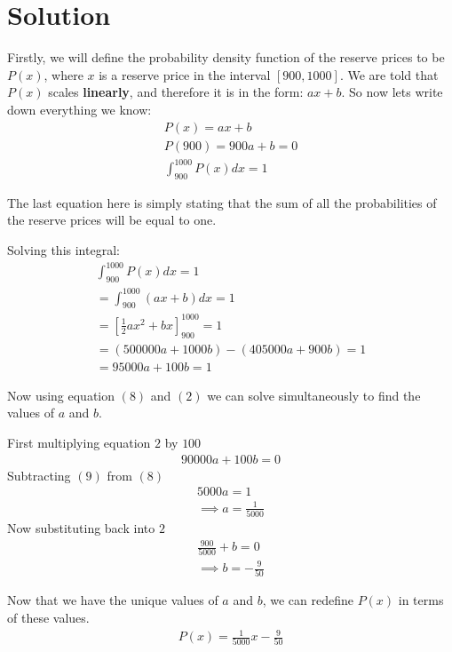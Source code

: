 \documentclass{article}
\begin{document}
\section*{Solution}
\indent Firstly, we will define the probability density function of the reserve prices to be 
$P(x)$, where $x$ is a reserve price in the interval $[900, 1000]$. We are told that $P(x)$
scales \textbf{linearly}, and therefore it is in the form: $ax + b$. So now lets write down
everything we know:
\setlength{\jot}{15pt} %
\begin{gather}
    P(x) = ax + b \\
    P(900) = 900a + b = 0 \\
    \int_{900}^{1000}P(x)dx = 1
\end{gather}

The last equation here is simply stating that the sum of all the probabilities of the reserve 
prices will be equal to one.

Solving this integral:
\begin{gather}
    \int_{900}^{1000}P(x)dx = 1 \\
    = \int_{900}^{1000}(ax+b)dx = 1 \\
    = \left[\frac{1}{2}ax^2 + bx\right]_{900}^{1000} = 1 \\
    = (500000a + 1000b) - (405000a + 900b) = 1 \\
    = 95000a + 100b = 1
\end{gather}

Now using equation $(8)$ and $(2)$ we can solve simultaneously to find the values of $a$ and $b$.

First multiplying equation $2$ by $100$
\begin{gather}
    90000a + 100b = 0
\end{gather}
Subtracting $(9)$ from $(8)$
\begin{gather}
    5000a = 1 \\
    \implies a = \frac{1}{5000}
\end{gather}
Now substituting back into $2$
\begin{gather}
    \frac{900}{5000} + b = 0 \\
    \implies b = -\frac{9}{50} 
\end{gather}

Now that we have the unique values of $a$ and $b$, we can redefine $P(x)$ in terms of these values.
\begin{gather}
    P(x) = \frac{1}{5000}x - \frac{9}{50}
\end{gather}
\end{document}

